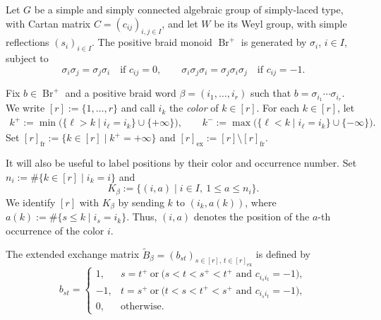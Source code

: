 \documentclass[12pt, reqno]{amsart}
\theoremstyle{plain}
\theoremstyle{definition}
\numberwithin{equation}{section}
\newcommand{\Br}{{\operatorname{Br}}}
\begin{document}
Let \(G\) be a simple and simply connected algebraic group of simply-laced
type, with Cartan matrix \(C=(c_{ij})_{i,j\in I}\), and let \(W\) be its
Weyl group, with simple reflections \((s_i)_{i\in I}\). The positive braid
monoid \(\Br^+\) is generated by \(\sigma_i\), \(i\in I\), subject to
\begin{equation}\label{eq:positive-braid-relations}
    \sigma_i\sigma_j=\sigma_j\sigma_i
    \quad\text{if }c_{ij}=0,
    \qquad
    \sigma_i\sigma_j\sigma_i
    =\sigma_j\sigma_i\sigma_j
    \quad\text{if }c_{ij}=-1.
\end{equation}

Fix \(b\in\Br^+\) and a positive braid word
\(\beta=(i_1,\ldots,i_r)\) such that
\(b=\sigma_{i_1}\cdots\sigma_{i_r}\). We write
\([r]:=\{1,\ldots,r\}\) and call \(i_k\) the \emph{color} of
\(k\in[r]\). For each \(k\in[r]\), let
\[
    \begin{aligned}
        k^+
        :=\min\bigl(\{\ell>k\mid i_\ell=i_k\}
            \cup\{+\infty\}\bigr),\qquad
        k^-
        :=\max\bigl(\{\ell<k\mid i_\ell=i_k\}
            \cup\{-\infty\}\bigr).
    \end{aligned}
\]
Set \([r]_{\mathrm{fr}}:=\{k\in[r]\mid k^+=+\infty\}\) and
\([r]_{\mathrm{ex}}:=[r]\setminus[r]_{\mathrm{fr}}\).

It will also be useful to label positions by their color and occurrence
number. Set
\(n_i:=\#\{k\in[r]\mid i_k=i\}\) and
\[
    K_\beta:=\{(i,a)\mid i\in I,\ 1\leq a\leq n_i\}.
\]
We identify \([r]\) with \(K_\beta\) by sending \(k\) to
\((i_k,a(k))\), where
\(a(k):=\#\{s\leq k\mid i_s=i_k\}\). Thus, \((i,a)\) denotes the
position of the \(a\)-th occurrence of the color \(i\).

The extended exchange matrix
\(\widetilde B_\beta=(b_{st})_{s\in[r],\,t\in[r]_{\mathrm{ex}}}\) is
defined by
\begin{equation}\label{eq:B-beta}
    b_{st}=
    \begin{cases}
        1,
        & s=t^+\ \text{or}\
          \bigl(s<t<s^+<t^+\text{ and }c_{i_s i_t}=-1\bigr),\\
        -1,
        & t=s^+\ \text{or}\
          \bigl(t<s<t^+<s^+\text{ and }c_{i_s i_t}=-1\bigr),\\
        0,
        & \text{otherwise}.
    \end{cases}
\end{equation}
\end{document}
